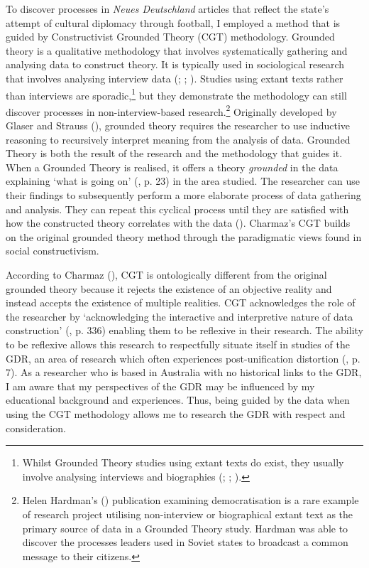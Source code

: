 To discover processes in \textit{Neues Deutschland} articles that reflect the state’s attempt of cultural diplomacy through football, I employed a method that is guided by Constructivist Grounded Theory (CGT) methodology. Grounded theory is a qualitative methodology that involves systematically gathering and analysing data to construct theory. It is typically used in sociological research that involves analysing interview data (\cite{oktay2012}; \cite{bryantcharmaz2007}; \cite{bryantcharmaz2019}). Studies using extant texts rather than interviews are sporadic,\footnote{Whilst Grounded Theory studies using extant texts do exist, they usually involve analysing interviews and biographies (\cite{plummer1983}; \cite{yarwood-rossjack2015}; \cite{ravenek2017}).}  but they demonstrate the methodology can still discover processes in non-interview-based research.\footnote{Helen Hardman’s (\citeyear{hardman2013}) publication examining democratisation is a rare example of research project utilising non-interview or biographical extant text as the primary source of data in a Grounded Theory study. Hardman was able to discover the processes leaders used in Soviet states to broadcast a common message to their citizens.}  Originally developed by Glaser and Strauss (\citeyear{glaserstrauss1977}), grounded theory requires the researcher to use inductive reasoning to recursively interpret meaning from the analysis of data. Grounded Theory is both the result of the research and the methodology that guides it. When a Grounded Theory is realised, it offers a theory \textit{grounded} in the data explaining ‘what is going on’ (\cite{glaserstrauss1977}, p. 23) in the area studied. The researcher can use their findings to subsequently perform a more elaborate process of data gathering and analysis. They can repeat this cyclical process until they are satisfied with how the constructed theory correlates with the data (\cite{glaserstrauss1977}). Charmaz’s CGT builds on the original grounded theory method through the paradigmatic views found in social constructivism.

According to Charmaz (\citeyear{charmaz2014}), CGT is ontologically different from the original grounded theory because it rejects the existence of an objective reality and instead accepts the existence of multiple realities. CGT acknowledges the role of the researcher by ‘acknowledging the interactive and interpretive nature of data construction’ (\cite{inabakakai2019}, p. 336) enabling them to be reflexive in their research. The ability to be reflexive allows this research to respectfully situate itself in studies of the GDR, an area of research which often experiences post-unification distortion (\cite{fullbrook1995}, p. 7). As a researcher who is based in Australia with no historical links to the GDR, I am aware that my perspectives of the GDR may be influenced by my educational background and experiences. Thus, being guided by the data when using the CGT methodology allows me to research the GDR with respect and consideration.

